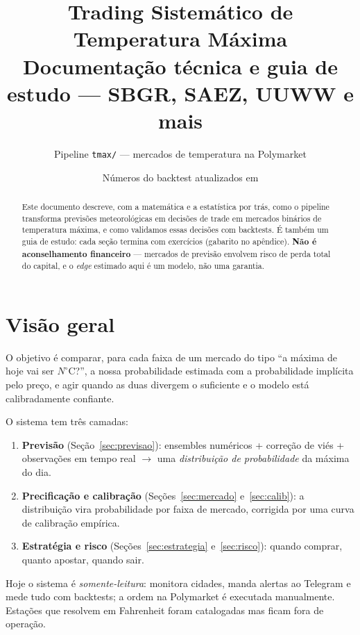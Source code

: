 \documentclass[11pt,a4paper]{article}
\title{\textbf{Trading Sistemático de Temperatura Máxima}\\
  \large Documentação técnica e guia de estudo --- SBGR, SAEZ, UUWW e mais}
\author{Pipeline \texttt{tmax/} --- mercados de temperatura na Polymarket}
\date{Números do backtest atualizados em \btUpdated}
\begin{document}
\maketitle
\thispagestyle{fancy}

\begin{abstract}
\noindent Este documento descreve, com a matemática e a estatística por trás,
como o pipeline transforma previsões meteorológicas em decisões de trade em
mercados binários de temperatura máxima, e como validamos essas decisões com
backtests. É também um guia de estudo: cada seção termina com exercícios
(gabarito no apêndice). \textbf{Não é aconselhamento financeiro} --- mercados
de previsão envolvem risco de perda total do capital, e o \emph{edge} estimado
aqui é um modelo, não uma garantia.
\end{abstract}

\tableofcontents
\bigskip

\section{Visão geral}
O objetivo é comparar, para cada faixa de um mercado do tipo ``a máxima de hoje
vai ser $N^\circ$C?'', a nossa probabilidade estimada com a probabilidade
implícita pelo preço, e agir quando as duas divergem o suficiente e o modelo
está calibradamente confiante.

O sistema tem três camadas:
\begin{enumerate}
  \item \textbf{Previsão} (Seção~\ref{sec:previsao}): ensembles numéricos +
    correção de viés + observações em tempo real $\rightarrow$ uma
    \emph{distribuição de probabilidade} da máxima do dia.
  \item \textbf{Precificação e calibração} (Seções~\ref{sec:mercado}
    e~\ref{sec:calib}): a distribuição vira probabilidade por faixa de mercado,
    corrigida por uma curva de calibração empírica.
  \item \textbf{Estratégia e risco} (Seções~\ref{sec:estrategia}
    e~\ref{sec:risco}): quando comprar, quanto apostar, quando sair.
\end{enumerate}

Hoje o sistema é \emph{somente-leitura}: monitora \btStations{} cidades,
manda alertas ao Telegram e mede tudo com backtests; a ordem na Polymarket é
executada manualmente. Estações que resolvem em Fahrenheit foram catalogadas
mas ficam fora de operação.
\end{document}
